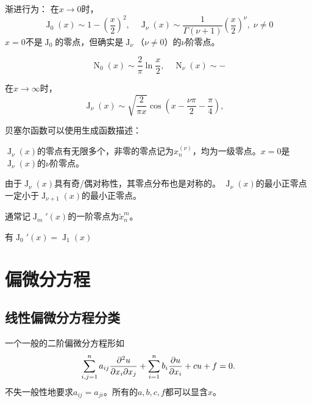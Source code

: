 \documentclass[UTF8]{ctexart}
\DeclareMathOperator{\besselj}{J}
\DeclareMathOperator{\norimann}{N}
\begin{document}
渐进行为：
在$x \to 0$时，
\begin{equation}
    \besselj_0 (x) \sim 1 - \left(\frac{x}{2}\right)^2, \quad
    \besselj_\nu (x) \sim \frac{1}{\Gamma(\nu+1)} \left(\frac{x}{2}\right)^\nu, \; \nu \neq 0
\end{equation}
$x=0$不是$\besselj_0$的零点，但确实是$\besselj_\nu$（$\nu \neq 0$）的$\nu$阶零点。

\begin{equation}
    \norimann_0(x) \sim \frac{2}{\pi} \ln \frac{x}{2}, \quad
    \norimann_\nu (x) \sim - 
\end{equation}

在$x \to \infty$时，
\begin{equation}
    \besselj_\nu(x) \sim \sqrt{\frac{2}{\pi x}} \cos \left( x - \frac{\nu \pi}{2} - \frac{\pi}{4} \right), \quad 
\end{equation}

贝塞尔函数可以使用生成函数描述：

$\besselj_\nu (x)$的零点有无限多个，非零的零点记为$x_n^{(\nu)}$，均为一级零点。$x=0$是$\besselj_\nu(x)$的$\nu$阶零点。

由于$\besselj_\nu (x)$具有奇/偶对称性，其零点分布也是对称的。
$\besselj_\nu (x)$的最小正零点一定小于$\besselj_{\nu+1} (x)$的最小正零点。

通常记$\besselj_m'(x)$的一阶零点为$\tilde{x}_n^{m}$。

有$\besselj_0'(x) = \besselj_1(x)$

\section{偏微分方程}

\subsection{线性偏微分方程分类}

一个一般的二阶偏微分方程形如
\begin{equation}
    \sum_{i,j=1}^n a_{ij} \pdv[2]{u}{x_i}{x_j} + \sum_{i=1}^n b_i \pdv{u}{x_i} + cu + f = 0.
    \label{eq:2nd-pde} 
\end{equation}
不失一般性地要求$a_{ij}=a_{ji}$。所有的$a,b,c,f$都可以显含$x$。
\end{document}
